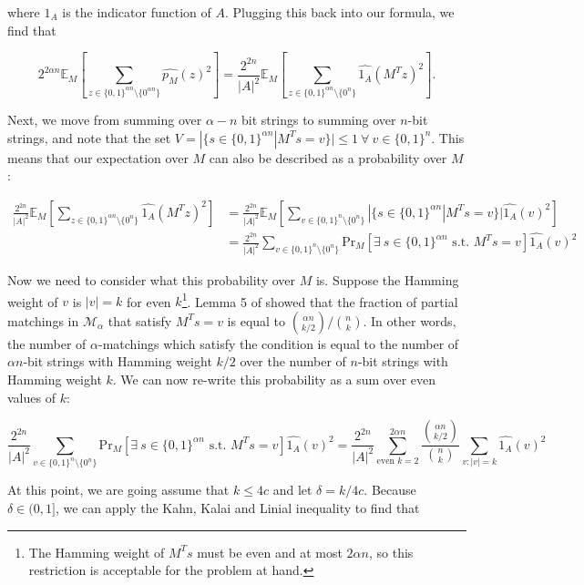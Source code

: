 \documentclass[a4paper]{article}
\begin{document}
        where $1_A$ is the indicator function of $A$. Plugging this back into our formula, we find that

        $$2^{2\alpha n}\mathbb{E}_M\left[\sum_{z \in \{0, 1\}^{\alpha n}\setminus\{0^{\alpha n}\}}\widehat{p_M}(z)^2\right] = \frac{2^{2n}}{|A|^2}\mathbb{E}_M\left[\sum_{z \in \{0, 1\}^{\alpha n}\setminus\{0^n\}}\widehat{1_A}(M^Tz)^2\right].$$

        Next, we move from summing over $\alpha-n$ bit strings to summing over $n$-bit strings, and note that the set $V = |\{s \in \{0, 1\}^{\alpha n}|M^Ts = v\}| \leq 1 ~\forall~ v \in \{0, 1\}^n$. This means that our expectation over $M$ can also be described as a probability over $M$:

        \begin{align*}
            \frac{2^{2n}}{|A|^2}\mathbb{E}_M\left[\sum_{z \in \{0, 1\}^{\alpha n}\setminus\{0^n\}}\widehat{1_A}(M^Tz)^2\right] &= \frac{2^{2n}}{|A|^2}\mathbb{E}_M\left[\sum_{v \in \{0, 1\}^n\setminus\{0^n\}}|\{s \in \{0, 1\}^{\alpha n}|M^Ts = v\}|\widehat{1_A}(v)^2\right]\\
            &= \frac{2^{2n}}{|A|^2}\sum_{v \in \{0, 1\}^n\setminus\{0^n\}}\mathrm{Pr}_M[\exists~ s \in \{0, 1\}^{\alpha n} \textrm{ s.t. } M^Ts = v]\widehat{1_A}(v)^2
        \end{align*}

        Now we need to consider what this probability over $M$ is. Suppose the Hamming weight of $v$ is $|v| = k$ for even $k$\footnote{The Hamming weight of $M^Ts$ must be even and at most $2\alpha n$, so this restriction is acceptable for the problem at hand.}. Lemma 5 of \cite{Gavinsky:2007:ESO:1250790.1250866} showed that the fraction of partial matchings in $\mathcal{M}_\alpha$ that satisfy $M^Ts = v$ is equal to $\binom{\alpha n}{k/2}/\binom{n}{k}$. In other words, the number of $\alpha$-matchings which satisfy the condition is equal to the number of $\alpha n$-bit strings with Hamming weight $k/2$ over the number of $n$-bit strings with Hamming weight $k$. We can now re-write this probability as a sum over even values of $k$:

        $$\frac{2^{2n}}{|A|^2}\sum_{v \in \{0, 1\}^n\setminus\{0^n\}}\mathrm{Pr}_M[\exists~ s \in \{0, 1\}^{\alpha n} \textrm{ s.t. } M^Ts = v]\widehat{1_A}(v)^2 = \frac{2^{2n}}{|A|^2}\sum_{\textrm{even }k=2}^{2\alpha n}\frac{\binom{\alpha n}{k/2}}{\binom{n}{k}}\sum_{v:|v| = k}\widehat{1_A}(v)^2$$

        At this point, we are going assume that $k \leq 4c$ and let $\delta = k/4c$. Because $\delta \in (0,1]$, we can apply the Kahn, Kalai and Linial inequality \cite{21923} to find that
\end{document}
